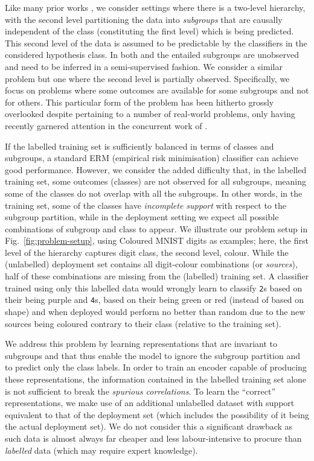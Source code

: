 Like many prior works
\citep{SohDunAngGuetal20,kim2019learning,creager2021environment,SagRagKohLia20}, we consider
settings where there is a two-level hierarchy, with the second level partitioning the data into
\emph{subgroups} that are causally independent of the class (constituting the first level) which is
being predicted. 
%
This second level of the data is assumed to be predictable by the classifiers in the considered
hypothesis class. 
%
In both \citet{SohDunAngGuetal20} and \citet{creager2019flexibly} the entailed subgroups are
unobserved and need to be inferred in a semi-supervised fashion. We consider a similar problem but
one where the second level is partially observed.
%
Specifically, we focus on problems where some outcomes are available for some subgroups and not for
others. 
%
This particular form of the problem has been hitherto grossly overlooked
despite pertaining to a number of real-world problems, only having recently garnered attention in
the concurrent work of \citet{yang2023change}.

%
If the labelled training set is sufficiently balanced in terms of classes and subgroups, a standard
ERM (empirical risk minimisation) classifier can achieve good performance.
%
However, we consider the added difficulty that, in the labelled training set, some outcomes
(classes) are not observed for all subgroups, meaning some of the classes do not overlap with all
the subgroups.
%
In other words, in the training set, some of the classes have \emph{incomplete support} with
respect to the subgroup partition, while in the deployment setting we expect all possible
combinations of subgroup and class to appear.
%
We illustrate our problem setup in Fig.~\ref{fig:problem-setup}, using Coloured MNIST digits as
examples; here, the first level of the hierarchy captures digit class, the second level, colour. 
%
While the (unlabelled) deployment set contains all digit-colour combinations (or \emph{sources}),
half of these combinations are missing from the (labelled) training set. 
%
A classifier trained using only this labelled data would wrongly learn to classify \texttt{2}s based
on their being {\color{purple}purple} and \texttt{4}s, based on their being {\color{green}green} or
{\color{red}red} (instead of based on shape) and when deployed would perform no better than random
due to the new sources being coloured contrary to their class (relative to the training set).

We address this problem by learning representations that are invariant to subgroups and that thus
enable the model to ignore the subgroup partition and to predict only the class labels.
%
In order to train an encoder capable of producing these representations, the information contained
in the labelled training set alone is not sufficient to break the \emph{spurious correlations}.
%
To learn the ``correct'' representations, we make use of an additional unlabelled dataset with
support equivalent to that of the deployment set (which includes the possibility of it being the
actual deployment set).
%
We do not consider this a significant drawback as such data is almost always far cheaper and less
labour-intensive to procure than \emph{labelled} data (which may require expert knowledge).
%

